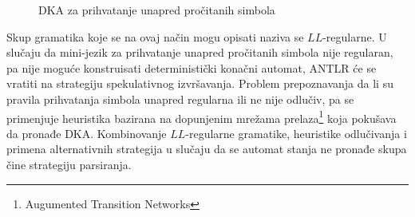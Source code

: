 \begin{figure}[h]
\caption{DKA za prihvatanje unapred pročitanih simbola}
\label{fig:lookahead_dfa}
\end{figure}

Skup gramatika koje se na ovaj način mogu opisati naziva se $LL$-regularne.
U slučaju da mini-jezik za prihvatanje unapred pročitanih simbola nije regularan, pa nije moguće konstruisati deterministički konačni automat, ANTLR će se vratiti na strategiju spekulativnog izvršavanja.
Problem prepoznavanja da li su pravila prihvatanja simbola unapred regularna ili ne nije odlučiv, pa se primenjuje heuristika bazirana na dopunjenim mrežama prelaza\footnote{\eng Augumented Transition Networks} koja pokušava da pronađe DKA.
Kombinovanje $LL$-regularne gramatike, heuristike odlučivanja i primena alternativnih strategija u slučaju da se automat stanja ne pronađe skupa čine \LLa strategiju parsiranja.
